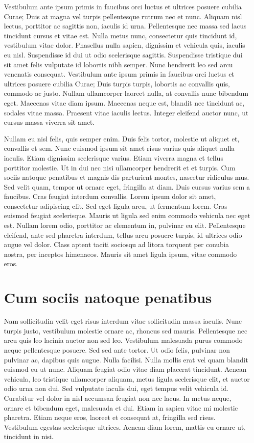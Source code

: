 \documentclass{EPUProjetDi}
\begin{document}
Vestibulum ante ipsum primis in faucibus orci luctus et ultrices posuere cubilia Curae; Duis at magna vel turpis pellentesque rutrum nec et nunc. Aliquam nisl lectus, porttitor ac sagittis non, iaculis id urna. Pellentesque nec massa sed lacus tincidunt cursus et vitae est. Nulla metus nunc, consectetur quis tincidunt id, vestibulum vitae dolor. Phasellus nulla sapien, dignissim et vehicula quis, iaculis eu nisl. Suspendisse id dui ut odio scelerisque sagittis. Suspendisse tristique dui sit amet felis vulputate id lobortis nibh semper. Nunc hendrerit leo sed arcu venenatis consequat. Vestibulum ante ipsum primis in faucibus orci luctus et ultrices posuere cubilia Curae; Duis turpis turpis, lobortis ac convallis quis, commodo ac justo. Nullam ullamcorper laoreet nulla, at convallis nunc bibendum eget. Maecenas vitae diam ipsum. Maecenas neque est, blandit nec tincidunt ac, sodales vitae massa. Praesent vitae iaculis lectus. Integer eleifend auctor nunc, ut cursus massa viverra sit amet.

Nullam eu nisl felis, quis semper enim. Duis felis tortor, molestie ut aliquet et, convallis et sem. Nunc euismod ipsum sit amet risus varius quis aliquet nulla iaculis. Etiam dignissim scelerisque varius. Etiam viverra magna et tellus porttitor molestie. Ut in dui nec nisi ullamcorper hendrerit et et turpis. Cum sociis natoque penatibus et magnis dis parturient montes, nascetur ridiculus mus. Sed velit quam, tempor ut ornare eget, fringilla at diam. Duis cursus varius sem a faucibus. Cras feugiat interdum convallis. Lorem ipsum dolor sit amet, consectetur adipiscing elit. Sed eget ligula arcu, ut fermentum lorem. Cras euismod feugiat scelerisque. Mauris ut ligula sed enim commodo vehicula nec eget est. Nullam lorem odio, porttitor ac elementum in, pulvinar eu elit. Pellentesque eleifend, ante sed pharetra interdum, tellus arcu posuere turpis, id ultrices odio augue vel dolor. Class aptent taciti sociosqu ad litora torquent per conubia nostra, per inceptos himenaeos. Mauris sit amet ligula ipsum, vitae commodo eros.

\section{Cum sociis natoque penatibus}

Nam sollicitudin velit eget risus interdum vitae sollicitudin massa iaculis. Nunc turpis justo, vestibulum molestie ornare ac, rhoncus sed mauris. Pellentesque nec arcu quis leo lacinia auctor non sed leo. Vestibulum malesuada purus commodo neque pellentesque posuere. Sed sed ante tortor. Ut odio felis, pulvinar non pulvinar ac, dapibus quis augue. Nulla facilisi. Nulla mollis erat vel quam blandit euismod eu ut nunc. Aliquam feugiat odio vitae diam placerat tincidunt. Aenean vehicula, leo tristique ullamcorper aliquam, metus ligula scelerisque elit, et auctor odio urna non dui. Sed vulputate iaculis dui, eget tempus velit vehicula id. Curabitur vel dolor in nisl accumsan feugiat non nec lacus. In metus neque, ornare et bibendum eget, malesuada et dui. Etiam in sapien vitae mi molestie pharetra. Etiam neque eros, laoreet et consequat at, fringilla sed risus. Vestibulum egestas scelerisque ultrices. Aenean diam lorem, mattis eu ornare ut, tincidunt in nisi.
\end{document}
